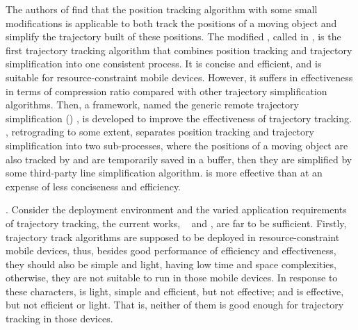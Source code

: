 The authors of \cite{Trajcevski:LDRH} find that the position tracking algorithm \ldr with some small modifications is applicable to both track the positions of a moving object and simplify the trajectory built of these positions. The modified \ldr,  called \ldrh in \cite{Lange:Tracking}, is the first trajectory tracking algorithm that combines position tracking and trajectory simplification into one consistent process. It is concise and efficient, and is suitable for resource-constraint mobile devices. However, it suffers in effectiveness in terms of compression ratio compared with other trajectory simplification algorithms. %
%
Then, a framework, named the generic remote trajectory simplification (\grts) \cite{Lange:GRTS,Lange:Tracking}, is developed to improve the effectiveness of trajectory tracking. \grts, retrograding to some extent, separates position tracking and trajectory simplification into two sub-processes, where the positions of a moving object are also tracked by \ldr and are temporarily saved in a buffer, then they are simplified by some third-party line simplification algorithm. \grts is more effective than \ldrh at an expense of less conciseness and efficiency.
%



. Consider the deployment environment and the varied application requirements of trajectory tracking, the current works, \ie~\ldrh \cite{Trajcevski:LDRH} and \grts \cite{Lange:GRTS,Lange:Tracking}, are far to be sufficient. Firstly, trajectory track algorithms are supposed to be deployed in resource-constraint mobile devices, thus, besides good performance of efficiency and effectiveness, they should also be simple and light, \ie having low time and space complexities, otherwise, they are not suitable to run in those mobile devices. In response to these characters, \ldrh is light, simple and efficient, but not effective; and \grts is effective, but not efficient or light. That is, neither of them is good enough for trajectory tracking in those devices.

